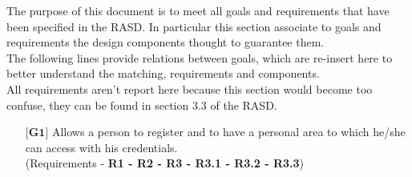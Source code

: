 The purpose of this document is to meet all goals and requirements that have been specified in the RASD. In particular this section associate to goals and requirements the design components thought to guarantee them.\\
The following lines provide relations between goals, which are re-insert here to better understand the matching, requirements and components.\\
All requirements aren't report here because this section would become too confuse, they can be found in section 3.3 of the RASD.

\begin{itemize}
	\item[${\textbf{[G1]}}$] {Allows a person to register and to have a personal area to which he/she can access with his 				credentials.\\(Requirements - \textbf{R1 - R2 - R3 - R3.1 - R3.2 - R3.3})}
			

\end{itemize}
